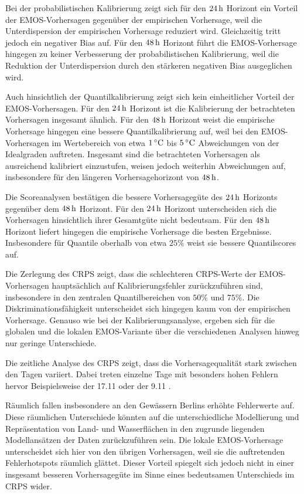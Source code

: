 Bei der probabilistischen Kalibrierung zeigt sich für den $24\,\mathrm{h}$ Horizont ein Vorteil der EMOS-Vorhersagen gegenüber der empirischen Vorhersage, weil die Unterdispersion der empirischen Vorhersage reduziert wird. Gleichzeitig tritt jedoch ein negativer Bias auf. Für den $48\,\mathrm{h}$ Horizont führt die EMOS-Vorhersage hingegen zu keiner Verbesserung der probabilistischen Kalibrierung, weil die Reduktion der Unterdispersion durch den stärkeren negativen Bias ausgeglichen wird.

Auch hinsichtlich der Quantilkalibrierung zeigt sich kein einheitlicher Vorteil der EMOS-Vorhersagen. Für den $24\,\mathrm{h}$ Horizont ist die Kalibrierung der betrachteten Vorhersagen insgesamt ähnlich. Für den $48\,\mathrm{h}$ Horizont weist die empirische Vorhersage hingegen eine bessere Quantilkalibrierung auf, weil bei den EMOS-Vorhersagen im Wertebereich von etwa $1\,^\circ\mathrm{C}$ bis $5\,^\circ\mathrm{C}$ Abweichungen von der Idealgraden auftreten. Insgesamt sind die betrachteten Vorhersagen als ausreichend kalibriert einzustufen, weisen jedoch weiterhin Abweichungen auf, insbesondere für den längeren Vorhersagehorizont von $48\,\mathrm{h}$.

Die Scoreanalysen bestätigen die bessere Vorhersagegüte des $24\,\mathrm{h}$ Horizonts gegenüber dem $48\,\mathrm{h}$ Horizont. Für den $24\,\mathrm{h}$ Horizont unterscheiden sich die Vorhersagen hinsichtlich ihrer Gesamtgüte nicht bedeutsam. Für den $48\,\mathrm{h}$ Horizont liefert hingegen die empirische Vorhersage die besten Ergebnisse. Insbesondere für Quantile oberhalb von etwa $25\%$ weist sie bessere Quantilscores auf. 

Die Zerlegung des CRPS zeigt, dass die schlechteren CRPS-Werte der EMOS-Vor\-hersagen hauptsächlich auf Kalibrierungs\-fehler zurückzuführen sind, insbesondere in den zentralen Quantilbereichen von $50\%$ und $75\%$. Die Diskriminationsfähigkeit unterscheidet sich hingegen kaum von der empirischen Vorhersage. Genauso wie bei der Kalibrierungsanalyse, ergeben sich für die globalen und die lokalen EMOS-Variante über die verschiedenen Analysen hinweg nur geringe Unterschiede.

Die zeitliche Analyse des CRPS zeigt, dass die Vorhersagequalität stark zwischen den Tagen variiert. Dabei treten einzelne Tage mit besonders hohen Fehlern hervor Beispielsweise der 17.11 oder der 9.11 .

Räumlich fallen insbesondere an den Gewässern Berlins erhöhte Fehlerwerte auf. Diese räumlichen Unterschiede könnten auf die unterschiedliche Modellierung und Repräsentation von Land- und Wasserflächen in den zugrunde liegenden Modellansätzen der Daten zurückzuführen sein. Die lokale EMOS-Vorhersage unterscheidet sich hier von den übrigen Vorhersagen, weil sie die auftretenden Fehlerhotspots räumlich glättet. Dieser Vorteil spiegelt sich jedoch nicht in einer insgesamt besseren Vorhersagegüte im Sinne eines bedeutsamen Unterschieds im CRPS wider. 


